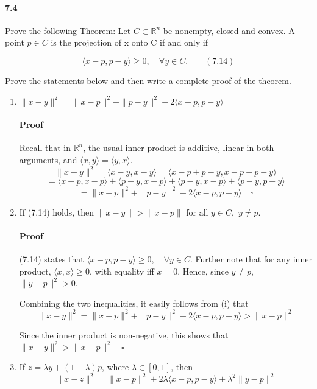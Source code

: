 \documentclass[letterpaper,12pt]{article}
\theoremstyle{definition}
\begin{document}
\paragraph{7.4} Prove the following Theorem: Let $ C \subset \mathbb{R}^n$ be nonempty, closed and convex. A point $p \in C$ is the projection of x onto C if and only if

$$ \langle x - p, p - y \rangle \ge 0, \quad \forall y \in C. \qquad (7.14)$$

Prove the statements below and then write a complete proof of the theorem. 

\begin{enumerate}[label = (\roman*)]

\item $\| x - y\|^2 = \| x - p\|^2 + \| p - y\|^2 + 2 \langle x - p, p - y \rangle $

\paragraph{Proof} Recall that in $\mathbb{R}^n$, the usual inner product is additive, linear in both arguments, and $\langle x , y \rangle = \langle y, x \rangle$. $$\|x - y\|^2 = \langle x - y, x - y \rangle 
= \langle x - p + p - y, x - p + p - y \rangle$$
$$= \langle x - p, x - p \rangle + \langle p - y, x - p \rangle + \langle p - y, x - p \rangle + \langle  p - y,  p - y \rangle$$
$$= \| x - p\|^2 + \| p - y\|^2 + 2 \langle x - p, p - y \rangle \quad \square$$

\item If (7.14) holds, then $\| x - y\| > \| x - p \|$ for all $ y \in C,$ $y \neq p$.

\paragraph{Proof} (7.14) states that $ \langle x - p, p - y \rangle \ge 0, \quad \forall y \in C.$ Further note that for any inner product, $\langle x, x \rangle \ge 0$, with equality iff $x = 0$. Hence, since $y \neq p$, $\| y - p\|^2 > 0$.

Combining the two inequalities, it easily follows from (i) that $$\| x - y\|^2 = \| x - p\|^2 + \| p - y\|^2 + 2 \langle x - p, p - y \rangle > \| x - p \|^2$$

Since the inner product is non-negative, this shows that $\| x - y\|^2 > \| x - p \|^2 \quad \square$

\item If $ z = \lambda y + (1 - \lambda)p$, where $ \lambda \in [0,1]$, then $$\|x - z\|^2 = \| x - p\|^2 + 2 \lambda \langle x - p, p - y \rangle + \lambda^2 \| y - p \|^2$$


\end{enumerate}
\end{document}
